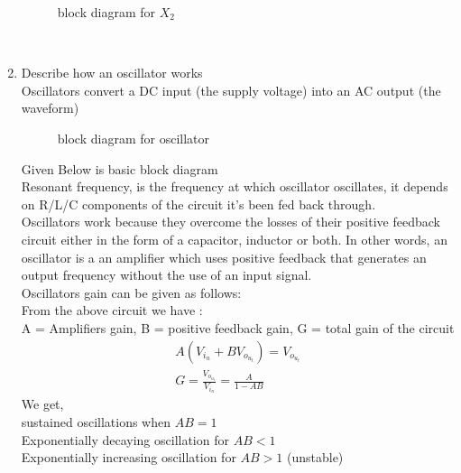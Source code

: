 \begin{enumerate}[label=\thesubsection.\arabic*.,ref=\thesubsection.\theenumi]
\begin{figure}[!ht]
\begin{center}
		\resizebox{\columnwidth}{!}{}
	\end{center}
\caption{block diagram for $X_2$}
\label{fig:block2}
\end{figure}
\\
\item Describe how an oscillator works \\
\solution Oscillators convert a DC input (the supply voltage) into an AC output (the waveform) \\
\begin{figure}[!ht]
    \begin{center}
		
		\resizebox{\columnwidth}{!}{}
	\end{center}
\caption{block diagram for oscillator}
\label{fig:block2}
\end{figure}
Given Below is basic block diagram\\
Resonant frequency, is the frequency at which oscillator oscillates, it depends on R/L/C components of the circuit it's been fed back through.\\
Oscillators work because they overcome the losses of their positive feedback circuit either in the form of a capacitor, inductor or both. In other words, an oscillator is a an amplifier which uses positive feedback that generates an output frequency without the use of an input signal.\\
Oscillators gain can be given as follows:\\
From the above circuit we have :\\
A = Amplifiers gain, B = positive feedback gain, G = total gain of the circuit
\begin{align}
    A(V_i_n + BV_o_u_t) =V_o_u_t \\
    G = \frac{V_o_u_t}{V_i_n} = \frac{A}{1 - AB}
\end{align}
We get,\\
sustained oscillations when $AB = 1$\\
Exponentially decaying oscillation for $AB<1$ \\
Exponentially increasing oscillation for $AB >1$ (unstable)\\
\end{enumerate}
